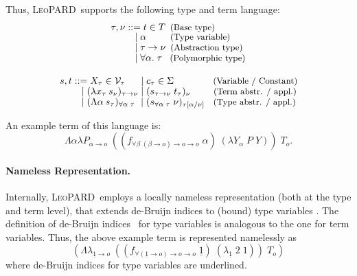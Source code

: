 \documentclass{llncs}
\def\sys{\mbox{\textsc{LeoPARD}}}
\begin{document}
Thus, \sys\ supports the following type and term language:\\[-.5em]
\begin{equation*}\begin{split}
  \tau, \nu  &::= t \in T                        \hspace{.5em} \text{\small(Base type)} \\[-.5em]
             & \quad | \; \alpha                 \hspace{2.5em} \text{\small(Type variable)} \\[-.4em]
             & \quad | \; \tau \to \nu           \hspace{.5em} \text{\small(Abstraction type)} \\[-.4em]
             & \quad | \; \forall \alpha. \; \tau \hspace{.8em}
             \text{\small(Polymorphic type)} \\[.5em]
  \end{split}\end{equation*}
\begin{equation*}\begin{split}
  s, t &::= X_\tau \in \mathcal{V}_\tau \hspace{1.65em} | \; c_\tau \in \Sigma \hspace{4.1em} \text{\small(Variable / Constant)} \\[-.4em]
       & \quad | \; (\lambda x_{\tau} \: s_\nu)_{\tau \to \nu}     
            \; | \; (s_{\tau \to \nu} \; t_\tau)_\nu  \hspace{2.4em} \text{\small(Term abstr. / appl.)} \\[-.4em]
       & \quad | \; (\Lambda \alpha \: s_\tau)_{\forall \alpha\;\tau} \hspace{.35em}
            \; | \; (s_{\forall \alpha\;\tau} \; \nu)_{\tau[\alpha/\nu]}
                                                      \hspace{.9em}
                                                      \text{\small(Type
                                                        abstr. / appl.)}  
  \end{split}\end{equation*}

\noindent An example term of this language is:\\
$$\Lambda \alpha\lambda P_{\alpha \to o}\;(( f_{\forall \beta \;(\beta \to o) \to o \to o} \; \alpha) \; (\lambda Y_\alpha\; P \; Y )) \; T_o.$$

\paragraph{Nameless Representation.} Internally, \sys\ employs a locally nameless representation (both at the type
and term level), that extends de-Bruijn indices to (bound) type
variables \cite{KRTU99}. The definition of de-Bruijn indices~\cite{Bruijn72} for type
variables is analogous to the one for term variables. Thus, the above example term is represented namelessly as
\[\left(\Lambda\lambda_{\underline{1} \to o}\;((f_{\forall(\underline{1} \to o) \to o \to o} \; \underline{1}) \; (\lambda_{\underline{1}}\; 2 \; 1 )) \; T_o\right)\]
where de-Bruijn indices for type variables are underlined.
\end{document}

